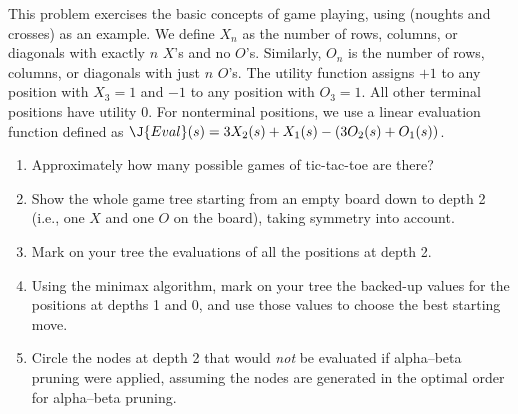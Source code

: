 \begin{exercise}
This problem exercises the basic concepts of game playing, using
(noughts and crosses) as an example.  We define \(X_n\) as the number of
rows, columns, or diagonals with exactly \(n\) \(X\)'s and no \(O\)'s.
Similarly, \(O_n\) is the number of rows, columns, or diagonals with
just \(n\) \(O\)'s.  The utility function assigns \(+1\) to any position
with \(X_3=1\) and \(-1\) to any position with \(O_3 = 1\).  All other
terminal positions have utility 0.  For nonterminal positions, we use
a linear evaluation function defined as \(\J{Eval}(s) = 3X_2(s) + X_1(s) -
(3O_2(s) + O_1(s))\).
\begin{enumerate}
\item Approximately how many possible games of tic-tac-toe are
there?

\item Show the whole game tree starting from an empty board down to
depth 2 (i.e., one \(X\) and one \(O\) on the board), taking symmetry into
account. 

\item Mark on your tree the evaluations of all the positions at
depth 2.

\item Using the minimax algorithm, mark on your tree the backed-up 
values for the positions at depths 1 and 0, and use those values to
choose the best starting move.

\item Circle the nodes at depth 2 that would {\it not} be evaluated
if alpha--beta pruning were applied, assuming the nodes are
generated in the optimal order for alpha--beta pruning.
\end{enumerate}
\end{exercise} 

